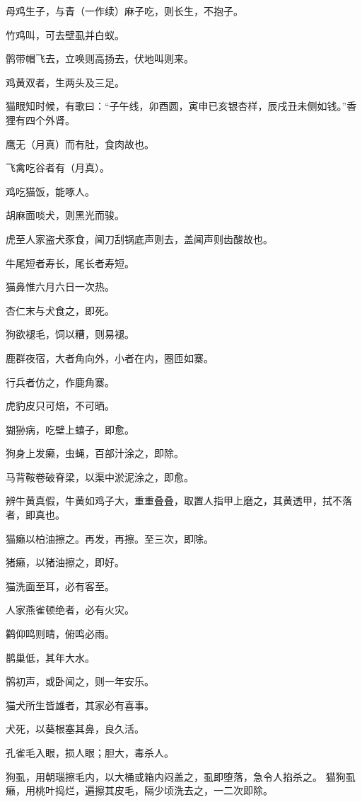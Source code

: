 \documentclass[a4paper,12pt,UTF8,twoside]{ctexbook}
\begin{document}
    母鸡生子，与青（一作续）麻子吃，则长生，不抱子。
    
    竹鸡叫，可去壁虱并白蚁。
    
    鹘带帽飞去，立唤则高扬去，伏地叫则来。
    
    鸡黄双者，生两头及三足。
    
    猫眼知时候，有歌曰：“子午线，卯酉圆，寅申已亥银杏样，辰戌丑未侧如钱。”香狸有四个外肾。
    
    鹰无（月真）而有肚，食肉故也。
    
    飞禽吃谷者有（月真）。
    
    鸡吃猫饭，能啄人。
    
    胡麻面啖犬，则黑光而骏。
    
    虎至人家盗犬豕食，闻刀刮锅底声则去，盖闻声则齿酸故也。
    
    牛尾短者寿长，尾长者寿短。
    
    猫鼻惟六月六日一次热。
    
    杏仁末与犬食之，即死。
    
    狗欲褪毛，饲以糟，则易褪。
    
    鹿群夜宿，大者角向外，小者在内，圈匝如寨。
    
    行兵者仿之，作鹿角寨。
    
    虎豹皮只可焙，不可晒。
    
    猢狲病，吃壁上蟢子，即愈。
    
    狗身上发癞，虫蝇，百部汁涂之，即除。
    
    马背鞍卷破脊梁，以渠中淤泥涂之，即愈。
    
    辨牛黄真假，牛黄如鸡子大，重重叠叠，取置人指甲上磨之，其黄透甲，拭不落者，即真也。
    
    猫癞以柏油擦之。再发，再擦。至三次，即除。
    
    猪癞，以猪油擦之，即好。
    
    猫洗面至耳，必有客至。
    
    人家燕雀顿绝者，必有火灾。
    
    鹳仰鸣则晴，俯鸣必雨。
    
    鹊巢低，其年大水。
    
    鹘初声，或卧闻之，则一年安乐。
    
    猫犬所生皆雄者，其家必有喜事。
    
    犬死，以葵根塞其鼻，良久活。
    
    孔雀毛入眼，损人眼；胆大，毒杀人。
    
    狗虱，用朝瑙擦毛内，以大桶或箱内闷盖之，虱即堕落，急令人掐杀之。 猫狗虱癞，用桃叶捣烂，遍擦其皮毛，隔少顷洗去之，一二次即除。
    
\end{document}
